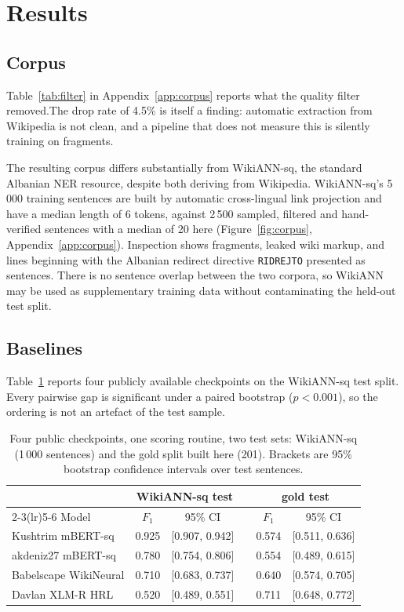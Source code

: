\section{Results}
\label{sec:results}

\subsection{Corpus}
\label{sec:results:corpus}

Table~\ref{tab:filter} in Appendix~\ref{app:corpus} reports what the quality filter removed.The drop rate of 4.5\% is itself a finding: automatic extraction from Wikipedia is not clean, and a pipeline that does not measure this is silently training on fragments.

The resulting corpus differs substantially from WikiANN-sq, the standard Albanian NER resource, despite both deriving from Wikipedia. WikiANN-sq's 5\,000 training sentences are built by automatic cross-lingual link projection and have a median length of 6 tokens, against 2\,500 sampled, filtered and hand-verified sentences with a median of 20 here (Figure~\ref{fig:corpus}, Appendix~\ref{app:corpus}). Inspection shows fragments, leaked wiki markup, and lines beginning with the Albanian redirect directive \texttt{RIDREJTO} presented as sentences. There is no sentence overlap between the two corpora, so WikiANN may be used as supplementary training data without contaminating the held-out test split.

\subsection{Baselines}
\label{sec:results:baselines}

Table~\ref{tab:baselines} reports four publicly available checkpoints on the WikiANN-sq test split. Every pairwise gap is significant under a paired bootstrap ($p < 0.001$), so the ordering is not an artefact of the test sample.

\begin{table}[htbp]
\centering
\caption{Four public checkpoints, one scoring routine, two test sets: WikiANN-sq (1\,000 sentences) and the gold split built here (201). Brackets are 95\% bootstrap confidence intervals over test sentences.}
\label{tab:baselines}
\begin{tabular}{lcclcc}
\toprule
& \multicolumn{2}{c}{WikiANN-sq test} & & \multicolumn{2}{c}{gold test} \\
\cmidrule(lr){2-3}\cmidrule(lr){5-6}
Model & $F_1$ & 95\% CI & & $F_1$ & 95\% CI \\
\midrule
Kushtrim mBERT-sq     & 0.925 & [0.907, 0.942] & & 0.574 & [0.511, 0.636] \\
akdeniz27 mBERT-sq    & 0.780 & [0.754, 0.806] & & 0.554 & [0.489, 0.615] \\
Babelscape WikiNeural & 0.710 & [0.683, 0.737] & & 0.640 & [0.574, 0.705] \\
Davlan XLM-R HRL      & 0.520 & [0.489, 0.551] & & 0.711 & [0.648, 0.772] \\
\bottomrule
\end{tabular}
\end{table}

